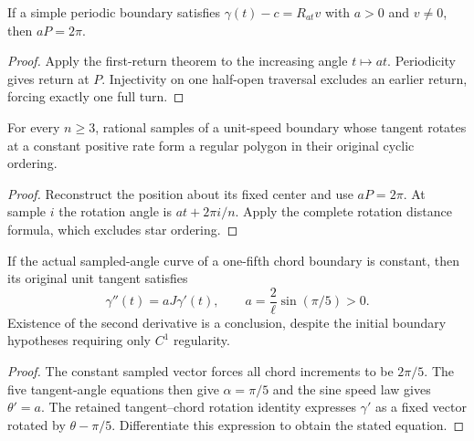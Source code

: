\begin{proposition}
\label{prop:uniform-rotation-one-turn}
\leanok
{}
If a simple periodic boundary satisfies
$\gamma(t)-c=R_{at}v$ with $a>0$ and $v\ne0$, then $aP=2\pi$.
\end{proposition}
\begin{proof}
\leanok
Apply the first-return theorem to the increasing angle $t\mapsto at$.
Periodicity gives return at $P$. Injectivity on one half-open traversal
excludes an earlier return, forcing exactly one full turn.
\end{proof}

\begin{proposition}
\label{prop:uniform-rotation-regular-samples}
\leanok
{}
For every $n\geq3$, rational samples of a unit-speed boundary whose tangent
rotates at a constant positive rate form a regular polygon in their original
cyclic ordering.
\end{proposition}
\begin{proof}
\leanok
Reconstruct the position about its fixed center and use $aP=2\pi$.
At sample $i$ the rotation angle is $at+2\pi i/n$.
Apply the complete rotation distance formula, which excludes star ordering.
\end{proof}

\begin{proposition}
\label{prop:constant-fifth-velocity}
\leanok
{}
If the actual sampled-angle curve of a one-fifth chord boundary is constant,
then its original unit tangent satisfies
\[
 \gamma''(t)=aJ\gamma'(t),\qquad
 a=\frac2\ell\sin(\pi/5)>0.
\]
Existence of the second derivative is a conclusion, despite the initial
boundary hypotheses requiring only $C^1$ regularity.
\end{proposition}
\begin{proof}
\leanok
The constant sampled vector forces all chord increments to be $2\pi/5$.
The five tangent-angle equations then give $\alpha=\pi/5$ and the sine
speed law gives $\theta'=a$. The retained tangent--chord rotation identity
expresses $\gamma'$ as a fixed vector rotated by $\theta-\pi/5$.
Differentiate this expression to obtain the stated equation.
\end{proof}


